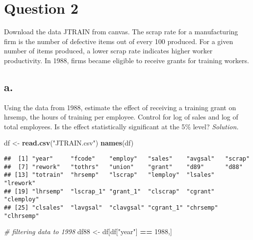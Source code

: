 \documentclass[
]{article}
\newenvironment{Shaded}{\begin{snugshade}}{\end{snugshade}}
\newcommand{\CommentTok}[1]{\textcolor[rgb]{0.56,0.35,0.01}{\textit{#1}}}
\newcommand{\DecValTok}[1]{\textcolor[rgb]{0.00,0.00,0.81}{#1}}
\newcommand{\KeywordTok}[1]{\textcolor[rgb]{0.13,0.29,0.53}{\textbf{#1}}}
\newcommand{\NormalTok}[1]{#1}
\newcommand{\OperatorTok}[1]{\textcolor[rgb]{0.81,0.36,0.00}{\textbf{#1}}}
\newcommand{\StringTok}[1]{\textcolor[rgb]{0.31,0.60,0.02}{#1}}
\begin{document}
\hypertarget{question-2}{%
\section{Question 2}\label{question-2}}

Download the data JTRAIN from canvas. The scrap rate for a manufacturing
firm is the number of defective items out of every 100 produced. For a
given number of items produced, a lower scrap rate indicates higher
worker productivity. In 1988, firms became eligible to receive grants
for training workers.

\hypertarget{a.}{%
\subsection{a.}\label{a.}}

Using the data from 1988, estimate the effect of receiving a training
grant on hrsemp, the hours of training per employee. Control for log of
sales and log of total employees. Is the effect statistically
significant at the 5\(\%\) level? \newline \newline \emph{Solution.}

\begin{Shaded}
\begin{Highlighting}[]
\NormalTok{df <-}\StringTok{ }\KeywordTok{read.csv}\NormalTok{(}\StringTok{"JTRAIN.csv"}\NormalTok{)}
\KeywordTok{names}\NormalTok{(df)}
\end{Highlighting}
\end{Shaded}

\begin{verbatim}
##  [1] "year"     "fcode"    "employ"   "sales"    "avgsal"   "scrap"   
##  [7] "rework"   "tothrs"   "union"    "grant"    "d89"      "d88"     
## [13] "totrain"  "hrsemp"   "lscrap"   "lemploy"  "lsales"   "lrework" 
## [19] "lhrsemp"  "lscrap_1" "grant_1"  "clscrap"  "cgrant"   "clemploy"
## [25] "clsales"  "lavgsal"  "clavgsal" "cgrant_1" "chrsemp"  "clhrsemp"
\end{verbatim}

\begin{Shaded}
\begin{Highlighting}[]
\CommentTok{# filtering data to 1998}
\NormalTok{df88 <-}\StringTok{ }\NormalTok{df[df[}\StringTok{"year"}\NormalTok{] }\OperatorTok{==}\StringTok{ }\DecValTok{1988}\NormalTok{,]}
\end{Highlighting}
\end{Shaded}
\end{document}
